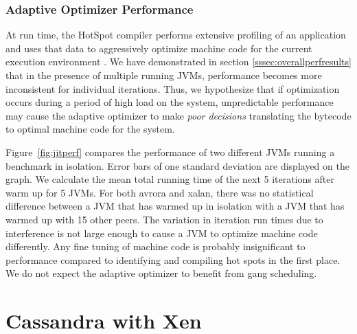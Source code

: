 \documentclass{sig-alternate}
\begin{document}
\begin{figure*}
\centering
{}
\caption{GC run time slowdown relative to 1 JVM.}
\label{fig:gcperf}
\end{figure*}

\subsubsection{Adaptive Optimizer Performance}
\begin{figure*}
\centering
{}
\caption{Mean total run time of JVMs warmed up in isolation and with 16 running JVMs in parallel.}
\label{fig:jitperf}
\end{figure*}
 
At run time, the HotSpot compiler performs extensive profiling of an application and uses that data to aggressively optimize machine code for the current execution environment \cite{hotspot:whitepaper}. We have demonstrated in section \ref{sssec:overallperfresults} that in the presence of multiple running JVMs, performance becomes more inconsistent for individual iterations. Thus, we hypothesize that if optimization occurs during a period of high load on the system, unpredictable performance may cause the adaptive optimizer to make \textit{poor decisions} translating the bytecode to optimal machine code for the system.

Figure~\ref{fig:jitperf} compares the performance of two different JVMs running a benchmark in isolation. Error bars of one standard deviation are displayed on the graph. We calculate the mean total running time of the next 5 iterations after warm up for 5 JVMs. For both avrora and xalan, there was no statistical difference between a JVM that has warmed up in isolation with a JVM that has warmed up with 15 other peers. The variation in iteration run times due to interference is not large enough to cause a JVM to optimize machine code differently. Any fine tuning of machine code is probably insignificant to performance compared to identifying and compiling hot spots in the first place. We do not expect the adaptive optimizer to benefit from gang scheduling.

\section{Cassandra with Xen} \label{sec:cassandra}
\end{document}
